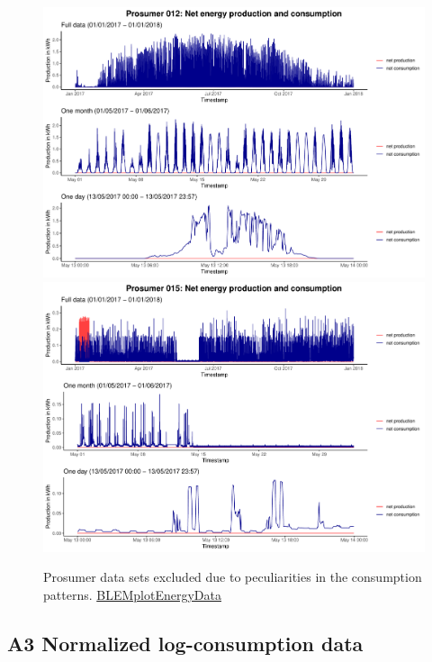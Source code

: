 \begin{centering}
\begin{figure}[H]
        \includegraphics[width=\textwidth-0.85cm]{thesis/graphs/timeseries/p012_prod&cons.pdf}\vspace{0.3cm}
        \includegraphics[width=\textwidth-0.85cm]{thesis/graphs/timeseries/p015_prod&cons.pdf}
        \caption[Prosumer data sets excluded due to peculiarities in the consumption patterns]{Prosumer data sets excluded due to peculiarities in the consumption patterns. \quantnet\href{ }{BLEMplotEnergyData}}
\end{figure}
\end{centering}


\subsection*{\hypertarget{AppA3:Figures:transform}{A3} Normalized log-consumption data}\label{AppA3:Figures:transform}

